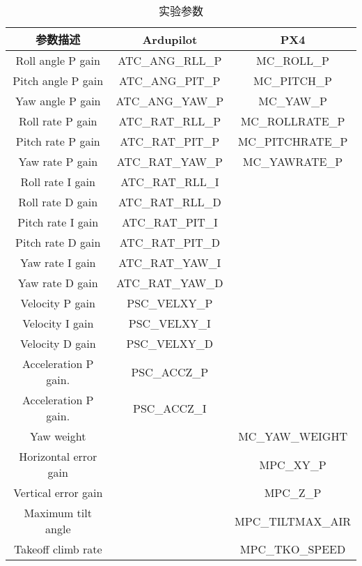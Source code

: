 \begin{table}[ht]
\small
\caption{实验参数}
\label{tab:fix_param_both}
\centering
\begin{tabular}{c|c|c}
\toprule[1.5pt]
\textbf{参数描述}      & \textbf{Ardupilot} & \textbf{PX4}          \\ 
\midrule[0.8pt]
Roll angle P gain         & ATC\_ANG\_RLL\_P   & MC\_ROLL\_P           \\ \hline
Pitch angle P gain        & ATC\_ANG\_PIT\_P   & MC\_PITCH\_P          \\ \hline
Yaw angle P gain          & ATC\_ANG\_YAW\_P   & MC\_YAW\_P            \\ \hline
Roll rate P gain          & ATC\_RAT\_RLL\_P   & MC\_ROLLRATE\_P       \\ \hline
Pitch rate P gain         & ATC\_RAT\_PIT\_P   & MC\_PITCHRATE\_P      \\ \hline
Yaw rate P gain           & ATC\_RAT\_YAW\_P   & MC\_YAWRATE\_P        \\ \hline
Roll rate I gain          & ATC\_RAT\_RLL\_I   &                       \\ \hline
Roll rate D gain          & ATC\_RAT\_RLL\_D   &                       \\ \hline
Pitch rate I gain         & ATC\_RAT\_PIT\_I   &                       \\ \hline
Pitch rate D gain         & ATC\_RAT\_PIT\_D   &                       \\ \hline
Yaw rate I gain           & ATC\_RAT\_YAW\_I   &                       \\ \hline
Yaw rate D gain           & ATC\_RAT\_YAW\_D   &                       \\ \hline
Velocity P gain           & PSC\_VELXY\_P      &                        \\ \hline
Velocity I gain           & PSC\_VELXY\_I      &                        \\ \hline
Velocity D gain           & PSC\_VELXY\_D      &                        \\ \hline
Acceleration P gain.      & PSC\_ACCZ\_P       &                        \\ \hline
Acceleration P gain.      & PSC\_ACCZ\_I       &                        \\ \hline
Yaw weight                &                    & MC\_YAW\_WEIGHT       \\ \hline
Horizontal error gain     &                    & MPC\_XY\_P            \\ \hline
Vertical error gain       &                    & MPC\_Z\_P             \\ \hline
Maximum tilt angle        &                    & MPC\_TILTMAX\_AIR     \\ \hline
Takeoff climb rate        &                    & MPC\_TKO\_SPEED       \\ 
\bottomrule[1.5pt]
\end{tabular}
\end{table}



       